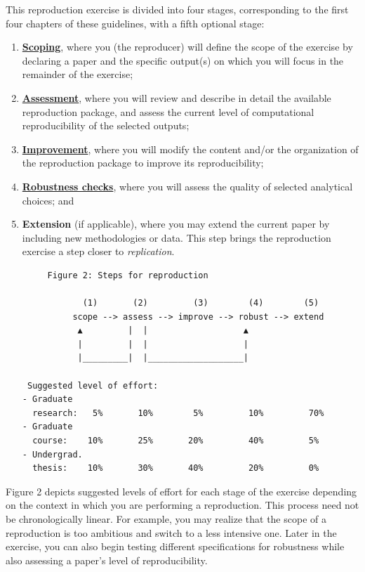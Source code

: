 \documentclass[]{book}
\begin{document}
This reproduction exercise is divided into four stages, corresponding to the first four chapters of these guidelines, with a fifth optional stage:

\begin{enumerate}
\def\labelenumi{\arabic{enumi}.}
\item
  \protect\hyperlink{scoping}{\textbf{Scoping}}, where you (the reproducer) will define the scope of the exercise by declaring a paper and the specific output(s) on which you will focus in the remainder of the exercise;\\
\item
  \protect\hyperlink{assessment}{\textbf{Assessment}}, where you will review and describe in detail the available reproduction package, and assess the current level of computational reproducibility of the selected outputs;
\item
  \protect\hyperlink{improvements}{\textbf{Improvement}}, where you will modify the content and/or the organization of the reproduction package to improve its reproducibility;\\
\item
  \protect\hyperlink{robust}{\textbf{Robustness checks}}, where you will assess the quality of selected analytical choices; and\\
\item
  \textbf{Extension} (if applicable), where you may extend the current paper by including new methodologies or data. This step brings the reproduction exercise a step closer to \emph{replication}.

\begin{verbatim}
     Figure 2: Steps for reproduction

            (1)       (2)         (3)        (4)        (5)
          scope --> assess --> improve --> robust --> extend
           ▲         |  |                   ▲
           |         |  |                   |
           |_________|  |___________________|

 Suggested level of effort:
- Graduate
  research:   5%       10%        5%         10%         70%
- Graduate
  course:    10%       25%       20%         40%         5%
- Undergrad.
  thesis:    10%       30%       40%         20%         0%
\end{verbatim}
\end{enumerate}

Figure 2 depicts suggested levels of effort for each stage of the exercise depending on the context in which you are performing a reproduction. This process need not be chronologically linear. For example, you may realize that the scope of a reproduction is too ambitious and switch to a less intensive one. Later in the exercise, you can also begin testing different specifications for robustness while also assessing a paper's level of reproducibility.
\end{document}
